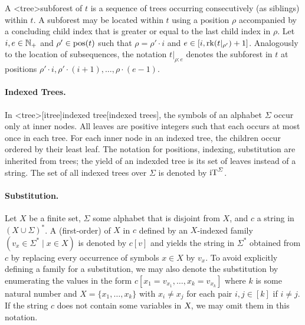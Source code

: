 \documentclass[../document.tex]{subfiles}
\begin{document}
    A <tree>{subforest} of \(t\) is a sequence of trees occurring consecutively (as siblings) within \(t\).
    A subforest may be located within \(t\) using a position \(\rho\) accompanied by a concluding child index that is greater or equal to the last child index in \(\rho\).
    Let \(i, e \in \mathbb{N}_+\) and \(\rho' \in \operatorname{pos}(t)\) such that \(\rho = \rho' \cdot i\) and \(e \in [i,\operatorname{rk}(t|_{\rho'})+1]\).
    Analogously to the location of subsequences, the notation \(t|_{\rho:e}\) denotes the subforest in \(t\) at positions \(\rho' \cdot i, \rho' \cdot (i+1), \ldots, \rho \cdot (e-1)\).

    \paragraph{Indexed Trees.}
    In <tree>[itree]{indexed tree}[indexed trees], the symbols of an alphabet \(\varSigma\) occur only at inner nodes.
    All leaves are positive integers such that each occurs at most once in each tree.
    For each inner node in an indexed tree, the children occur ordered by their least leaf.
    The notation for positions, indexing, substitution are inherited from trees; the yield of an indexded tree is its set of leaves instead of a string.
    The set of all indexed trees over \(\varSigma\) is denoted by \(\operatorname{iT}^\varSigma\).

    \paragraph{Substitution.}
    Let \(X\) be a finite set, \(\varSigma\) some alphabet that is disjoint from \(X\), and \(c\) a string in \((X \cup \varSigma)^*\).
    A (first-order)  of \(X\) in \(c\) defined by an \(X\)-indexed family \((v_x \in \varSigma^* \mid x \in X)\) is denoted by \(c[v]\) and yields the string in \(\varSigma^*\) obtained from \(c\) by replacing every occurrence of symbols \(x \in X\) by \(v_x\).
    To avoid explicitly defining a family for a substitution, we may also denote the substitution by enumerating the values in the form \(c[x_1=v_{x_1}, \ldots, x_{k}=v_{x_k}]\) where \(k\) is some natural number and \(X = \{x_1, \ldots, x_k\}\) with \(x_i \neq x_j\) for each pair \(i,j \in [k]\) if \(i\neq j\).
    If the string \(c\) does not contain some variables in \(\textsl{X}\), we may omit them in this notation.
\end{document}
